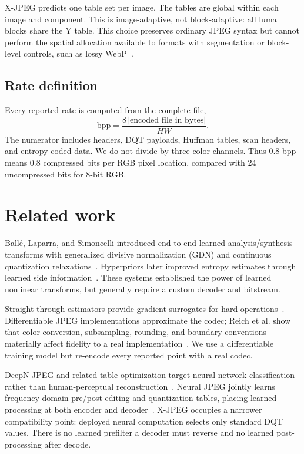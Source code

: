 \documentclass[10pt,twocolumn]{article}
\newcommand{\xjpeg}{X-JPEG}
\begin{document}
\xjpeg{} predicts one table set per image. The tables are global within each image and component. This is image-adaptive, not block-adaptive: all luma blocks share the Y table. This choice preserves ordinary JPEG syntax but cannot perform the spatial allocation available to formats with segmentation or block-level controls, such as lossy WebP~\cite{webp}.

\subsection{Rate definition}

Every reported rate is computed from the complete file,
\begin{equation}
  \mathrm{bpp}=\frac{8\,|\text{encoded file in bytes}|}{HW}.
\end{equation}
The numerator includes headers, DQT payloads, Huffman tables, scan headers, and entropy-coded data. We do not divide by three color channels. Thus 0.8 bpp means 0.8 compressed bits per RGB pixel location, compared with 24 uncompressed bits for 8-bit RGB.

\section{Related work}

Ball\'e, Laparra, and Simoncelli introduced end-to-end learned analysis/synthesis transforms with generalized divisive normalization (GDN) and continuous quantization relaxations~\cite{balle2016gdn,balle2017compression}. Hyperpriors later improved entropy estimates through learned side information~\cite{balle2018hyperprior}. These systems established the power of learned nonlinear transforms, but generally require a custom decoder and bitstream.

Straight-through estimators provide gradient surrogates for hard operations~\cite{bengio2013ste}. Differentiable JPEG implementations approximate the codec; Reich et al. show that color conversion, subsampling, rounding, and boundary conventions materially affect fidelity to a real implementation~\cite{reich2024diffjpeg}. We use a differentiable training model but re-encode every reported point with a real codec.

DeepN-JPEG and related table optimization target neural-network classification rather than human-perceptual reconstruction~\cite{liu2018deepnjpeg,li2020optjpeg}. Neural JPEG jointly learns frequency-domain pre/post-editing and quantization tables, placing learned processing at both encoder and decoder~\cite{mali2022neuraljpeg}. \xjpeg{} occupies a narrower compatibility point: deployed neural computation selects only standard DQT values. There is no learned prefilter a decoder must reverse and no learned post-processing after decode.
\end{document}
